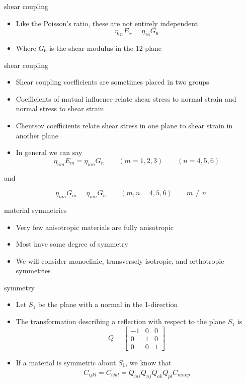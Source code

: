 \documentclass[
  letterpaper,
  ignorenonframetext,
  aspectratio=43,
  handout,
  12pt]{beamer}
\providecommand{\tightlist}{%
  \setlength{\itemsep}{0pt}\setlength{\parskip}{0pt}}
\providecommand{\tightlist}{%
\setlength{\itemsep}{0pt}\setlength{\parskip}{0pt}}
\begin{document}
\begin{frame}{shear coupling}
\protect\hypertarget{shear-coupling}{}
\begin{itemize}
\item
  Like the Poisson's ratio, these are not entirely independent
  \[\eta_{61} E_{x} = \eta_{16} G_{6}\]
\item
  Where \(G_6\) is the shear modulus in the \(12\) plane
\end{itemize}
\end{frame}

\begin{frame}{shear coupling}
\protect\hypertarget{shear-coupling-1}{}
\begin{itemize}
\tightlist
\item
  Shear coupling coefficients are sometimes placed in two groups
\item
  Coefficients of mutual influence relate shear stress to normal strain
  and normal stress to shear strain
\item
  Chentsov coefficients relate shear stress in one plane to shear strain
  in another plane
\item
  In general we can say
  \[\eta_{nm} E_m = \eta_{mn} G_{n} \qquad (m=1,2,3) \qquad (n=4,5,6)\]
\end{itemize}

and

\[\eta_{nm} G_m = \eta_{mn} G_n \qquad (m,n = 4,5,6) \qquad m \ne n\]
\end{frame}

\begin{frame}{material symmetries}
\protect\hypertarget{material-symmetries}{}
\begin{itemize}
\tightlist
\item
  Very few anisotropic materials are fully anisotropic
\item
  Most have some degree of symmetry
\item
  We will consider monoclinic, transversely isotropic, and orthotropic
  symmetries
\end{itemize}
\end{frame}

\begin{frame}{symmetry}
\protect\hypertarget{symmetry}{}
\begin{itemize}
\item
  Let \(S_1\) be the plane with a normal in the 1-direction
\item
  The transformation describing a reflection with respect to the plane
  \(S_1\) is \[Q = \begin{bmatrix}
    -1 & 0 & 0\\
    0 & 1 & 0\\
    0 & 0 & 1
  \end{bmatrix}\]
\item
  If a material is symmetric about \(S_1\), we know that
  \[C_{ijkl} = C_{ijkl}^\prime = Q_{mi}Q_{nj}Q_{ok}Q_{pl} C_{mnop}\]
\end{itemize}
\end{frame}
\end{document}
